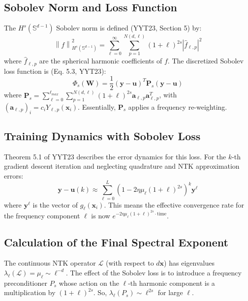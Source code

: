 \documentclass{article}
\begin{document}
\subsection{Sobolev Norm and Loss Function}
The $H^s(\mathbb{S}^{d-1})$ Sobolev norm is defined (YYT23, Section 5) by:
\begin{equation}
    \left\lVert f\right\rVert_{H^s(\mathbb{S}^{d-1})}^2 = \sum_{\ell=0}^\infty \sum_{p=1}^{N(d,\ell)} (1+\ell)^{2s}|\hat{f}_{\ell,p}|^2
\end{equation}
where $\hat{f}_{\ell,p}$ are the spherical harmonic coefficients of $f$. The discretized Sobolev loss function is (Eq. 5.3, YYT23):
\begin{equation}
    \Phi_s(\mathbf{W}) = \frac{1}{2} (\mathbf{y} - \mathbf{u})^T \mathbf{P}_s (\mathbf{y} - \mathbf{u})
    \label{eq:sobolev_loss_YYT23}
\end{equation}
where $\mathbf{P}_s = \sum_{\ell=0}^{\ell_{max}} \sum_{p=1}^{N(d,\ell)} (1+\ell)^{2s} \mathbf{a}_{\ell,p} \mathbf{a}_{\ell,p}^T$, with $(\mathbf{a}_{\ell,p})_i = c_i Y_{\ell,p}(\mathbf{x}_i)$. Essentially, $\mathbf{P}_s$ applies a frequency re-weighting.

\subsection{Training Dynamics with Sobolev Loss}
Theorem 5.1 of YYT23 describes the error dynamics for this loss. For the $k$-th gradient descent iteration and neglecting quadrature and NTK approximation errors:
\begin{equation}
    \mathbf{y} - \mathbf{u}(k) \approx \sum_{\ell=0}^L (1-2\eta\mu_\ell(1+\ell)^{2s})^k \mathbf{y}^\ell
\end{equation}
where $\mathbf{y}^\ell$ is the vector of $g_\ell(\mathbf{x}_i)$.
This means the effective convergence rate for the frequency component $\ell$ is now $e^{-2\eta \mu_\ell (1+\ell)^{2s} \cdot \text{time}}$.

\subsection{Calculation of the Final Spectral Exponent}
The continuous NTK operator $\mathcal{L}$ (with respect to $d\mathbf{x}$) has eigenvalues $\lambda_\ell(\mathcal{L}) = \mu_\ell \sim \ell^{-d}$.
The effect of the Sobolev loss is to introduce a frequency preconditioner $P_s$ whose action on the $\ell$-th harmonic component is a multiplication by $(1+\ell)^{2s}$. So, $\lambda_\ell(P_s) \sim \ell^{2s}$ for large $\ell$.
\end{document}
